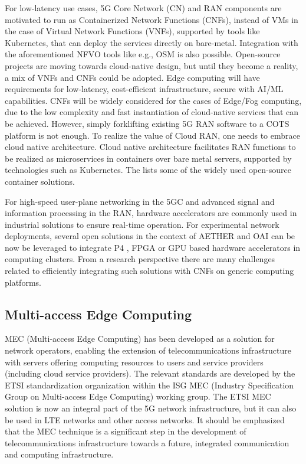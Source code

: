 For low-latency use cases, 5G Core Network (CN) and RAN components are motivated to run as Containerized Network Functions (CNFs), instead of VMs in the case of Virtual Network Functions (VNFs), supported by tools like Kubernetes, that can deploy the services directly on bare-metal. Integration with the aforementioned NFVO tools like e.g., OSM is also possible. Open-source projects are moving towards cloud-native design, but until they become a reality, a mix of VNFs and CNFs could be adopted. Edge computing will have requirements for low-latency, cost-efficient infrastructure, secure with AI/ML capabilities. CNFs will be widely considered for the cases of Edge/Fog computing, due to the low complexity and fast instantiation of cloud-native services that can be achieved. However, simply forklifting existing 5G RAN software to a COTS platform is not enough. To realize the value of Cloud RAN, one needs to embrace cloud native architecture. Cloud native architecture facilitates RAN functions to be realized as microservices in containers over bare metal servers, supported by technologies such as Kubernetes. The   lists some of the widely used open-source container solutions.



For high-speed user-plane networking in the 5GC and advanced signal and information processing in the RAN, hardware accelerators are commonly used in industrial solutions to ensure real-time operation. For experimental network deployments, several open solutions in the context of AETHER and OAI can be now be leveraged to integrate P4 \cite{macdavidSOSR2021}, FPGA\cite{kaltenberger2021, oaixilinx2022} or GPU \cite{aerialSDK2022} based hardware accelerators in computing clusters. From a research perspective there are many challenges related to efficiently integrating such solutions with CNFs on generic computing platforms.

\subsection{Multi-access Edge Computing}

MEC (Multi-access Edge Computing)  has been developed as a solution for network operators, enabling the extension of telecommunications infrastructure with servers offering computing resources to users and service providers (including cloud service providers). The relevant standards are developed by the ETSI standardization organization within the ISG MEC (Industry Specification Group on Multi-access Edge Computing) working group. The ETSI MEC solution is now an integral part of the 5G network infrastructure, but it can also be used in LTE networks and other access networks. It should be emphasized that the MEC technique is a significant step in the development of telecommunications infrastructure towards a future, integrated communication and computing infrastructure.

